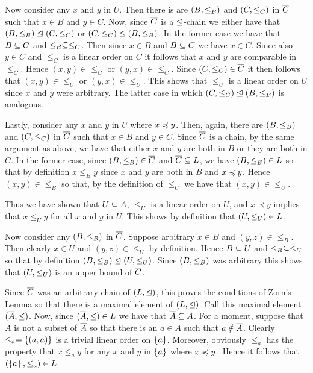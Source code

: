 {{    Now consider any $x$ and $y$ in $U$.
    Then there is are $\lord{B}$ and $\lord{C}$ in $\Cb$ such that $x \in B$ and $y \in C$.
    Now, since $\Cb$ is a $\tleq$-chain we either have that $\lord{B} \tleq \lord{C}$ or $\lord{C} \tleq \lord{B}$.
    In the former case we have that $B \ss C$ and $\leq_B \ss \leq_C$.
    Then since $x \in B$ and $B \ss C$ we have $x \in C$.
    Since also $y \in C$ and $\leq_C$ is a linear order on $C$ it follows that $x$ and $y$ are comparable in $\leq_C$.
    Hence $(x,y) \in \leq_C$ or $(y,x) \in \leq_C$.
    Since $\lord{C} \in \Cb$ it then follows that $(x,y) \in \leq_U$ or $(y,x) \in \leq_U$.
    This shows that $\leq_U$ is a linear order on $U$ since $x$ and $y$ were arbitrary.
    The latter case in which $\lord{C} \tleq \lord{B}$ is analogous.

    Lastly, consider any $x$ and $y$ in $U$ where $x \prece y$.
    Then, again, there are $\lord{B}$ and $\lord{C}$ in $\Cb$ such that $x \in B$ and $y \in C$.
    Since $\Cb$ is a chain, by the same argument as above, we have that either $x$ and $y$ are both in $B$ or they are both in $C$.
    In the former case, since $\lord{B} \in \Cb$ and $\Cb \ss L$, we have $\lord{B} \in L$ so that by definition $x \leq_B y$ since $x$ and $y$ are both in $B$ and $x \prece y$.
    Hence $(x,y) \in \leq_B$ so that, by the definition of $\leq_U$ we have that $(x,y) \in \leq_U$.

    Thus we have shown that $U \ss A$, $\leq_U$ is a linear order on $U$, and $x \prec y$ implies that $x \leq_U y$ for all $x$ and $y$ in $U$.
    This shows by definition that $\lord{U} \in L$.

    Now consider any $\lord{B}$ in $\Cb$.
    Suppose arbitrary $x \in B$ and $(y,z) \in \leq_B$.
    Then clearly $x \in U$ and $(y,z) \in \leq_U$ by definition.
    Hence $B \ss U$ and $\leq_B \ss \leq_U$ so that by definition $\lord{B} \tleq \lord{U}$.
    Since $\lord{B}$ was arbitrary this shows that $\lord{U}$ is an upper bound of $\Cb$.

    Since $\Cb$ was an arbitrary chain of $(L, \tleq)$, this proves the conditions of Zorn's Lemma so that there is a maximal element of $(L, \tleq)$.
    Call this maximal element $(\Ab, \leq)$.
    Now, since $(\Ab, \leq) \in L$ we have that $\Ab \ss A$.
    For a moment, suppose that $A$ is not a subset of $\Ab$ so that there is an $a \in A$ such that $a \notin \Ab$.
    Clearly $\leq_a = \braces{(a,a)}$ is a trivial linear order on $\braces{a}$.
    Moreover, obviously $\leq_a$ has the property that $x \leq_a y$ for any $x$ and $y$ in $\braces{a}$ where $x \prece y$.\
    Hence it follows that $(\braces{a}, \leq_a) \in L$.
    \fi

}}
